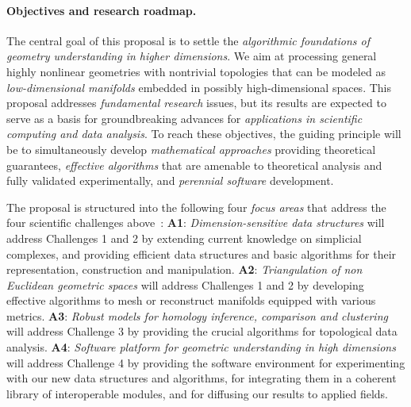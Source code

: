 \paragraph{Objectives and research roadmap.}
The central goal of this proposal is to settle the {\em algorithmic foundations of geometry understanding in higher dimensions}.  We aim at processing general highly nonlinear geometries with nontrivial topologies that can be modeled as  {\em low-dimensional manifolds} embedded in possibly high-dimensional spaces. %
This proposal addresses {\em fundamental
  research} issues, but its results are expected to serve as a basis
for groundbreaking advances for {\em applications in scientific computing
and data analysis}.  %
%
To reach these objectives, the guiding principle  will be to simultaneously
develop {\em mathematical approaches} providing theoretical
guarantees, {\em effective algorithms} that are amenable to
theoretical analysis and fully validated experimentally, and {\em
  perennial software} development.


The proposal is structured into the following four {\em focus areas}  that address the four scientific challenges above~:
{\bf A1}:  {\em Dimension-sensitive data  structures} will address Challenges 1 and 2 by extending current knowledge on simplicial complexes, and  providing efficient data structures and basic algorithms for their representation, construction and manipulation. 
  {\bf A2}:  {\em Triangulation of non Euclidean geometric spaces} will address Challenges 1 and 2 by developing effective algorithms to mesh or reconstruct manifolds equipped with various metrics.   {\bf A3}: {\em Robust models for homology inference, comparison and  clustering} will address Challenge 3 by providing the crucial  algorithms for topological data analysis.
 {\bf A4}:  {\em  Software platform for geometric understanding in high dimensions} will address Challenge 4 by providing the software environment for experimenting with our new data structures and algorithms, for integrating them in a coherent library of interoperable modules, and for diffusing our results to applied fields. 


